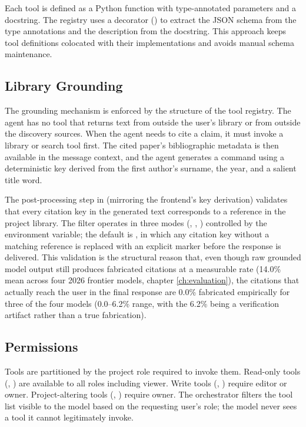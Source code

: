 Each tool is defined as a Python function with type-annotated parameters and a docstring. The registry uses a decorator () to extract the JSON schema from the type annotations and the description from the docstring. This approach keeps tool definitions colocated with their implementations and avoids manual schema maintenance.

\subsection{Library Grounding}

The grounding mechanism is enforced by the structure of the tool registry. The agent has no tool that returns text from outside the user's library or from outside the discovery sources. When the agent needs to cite a claim, it must invoke a library or search tool first. The cited paper's bibliographic metadata is then available in the message context, and the agent generates a  command using a deterministic key derived from the first author's surname, the year, and a salient title word.

The post-processing step in  (mirroring the frontend's  key derivation) validates that every citation key in the generated text corresponds to a reference in the project library. The filter operates in three modes (, , ) controlled by the  environment variable; the default is , in which any citation key without a matching reference is replaced with an explicit  marker before the response is delivered. This validation is the structural reason that, even though raw grounded model output still produces fabricated citations at a measurable rate (14.0\% mean across four 2026 frontier models, chapter \ref{ch:evaluation}), the citations that actually reach the user in the final response are 0.0\% fabricated empirically for three of the four models (0.0--6.2\% range, with the 6.2\% being a verification artifact rather than a true fabrication).

\subsection{Permissions}

Tools are partitioned by the project role required to invoke them. Read-only tools (, ) are available to all roles including viewer. Write tools (, ) require editor or owner. Project-altering tools (, ) require owner. The orchestrator filters the tool list visible to the model based on the requesting user's role; the model never sees a tool it cannot legitimately invoke.

